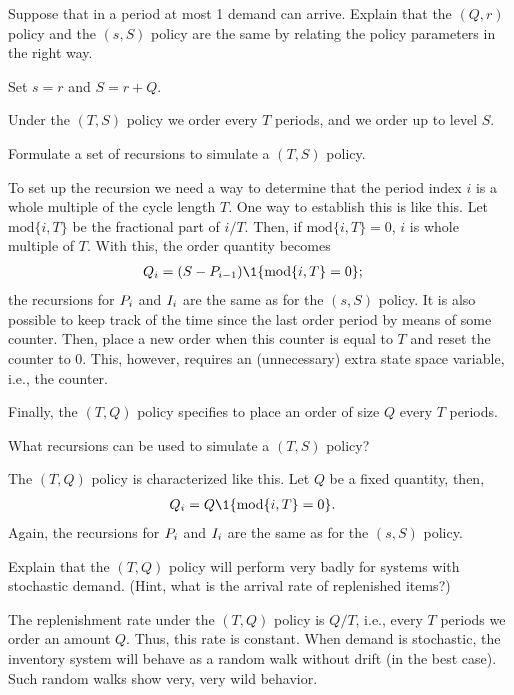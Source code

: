 \begin{exercise}
  Suppose that in a period at most 1 demand can arrive. Explain that the $(Q,r)$ policy and the $(s,S)$ policy are the same by relating the policy parameters in the right way.
  \begin{solution}
    Set $s=r$ and $S=r+Q$. 
  \end{solution}
\end{exercise}

Under the $(T,S)$ policy we order every $T$ periods, and we order up to level $S$. 

\begin{exercise}
Formulate a set of recursions to  simulate a $(T,S)$ policy.
\begin{solution}
To set up the recursion we need a way to determine that the period index $i$ is a whole multiple of the cycle length $T$. One way to establish this is like this. Let $\text{mod}\{i, T\}$ be the fractional part of $i/T$. Then, if $\text{mod}\{i, T\}=0$, $i$ is whole multiple of $T$. 
 With this, the order quantity becomes
\begin{align*}
  Q_i &= (S-\IP_{i-1}) \1{\text{mod}\{i, T\} = 0};
\end{align*}
the recursions for $P_i$ and $I_i$ are the same as for the $(s,S)$ policy.
It is also possible to keep track of the time since the last order period by means of some counter. Then, place a new order when this counter is equal to $T$ and reset the counter to 0. This, however, requires an (unnecessary) extra state space variable, i.e., the counter.
\end{solution}
  
\end{exercise}

Finally, the $(T,Q)$ policy specifies to place an order of size $Q$ every $T$ periods. 

\begin{exercise}
What  recursions can be used to simulate a $(T,S)$ policy?
\begin{solution}
The $(T,Q)$ policy is characterized like this. Let $Q$ be a fixed quantity, then,
\begin{align*}
  Q_i &= Q \1{\text{mod}\{i, T\} = 0}.
\end{align*}
Again, the recursions for $P_i$ and $I_i$ are the same as for the $(s,S)$ policy.
\end{solution}
\end{exercise}

\begin{exercise}
  Explain that the $(T,Q)$ policy will perform very badly for systems with stochastic demand. (Hint, what is the arrival rate of replenished items?)
  \begin{solution}
The replenishment rate under the $(T,Q)$ policy is $Q/T$, i.e., every $T$ periods we order an amount $Q$. Thus, this rate is constant. When demand is stochastic, the inventory system will behave as a random walk without drift (in the best case). Such random walks show very, very wild behavior. 
  \end{solution}
\end{exercise}

